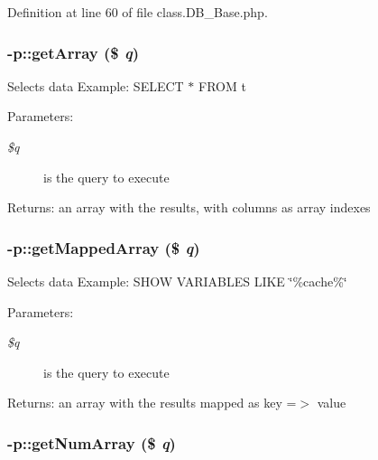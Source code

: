 Definition at line 60 of file class.DB\_\-Base.php.
\subsubsection{-p::getArray (\$ {\em q})\hspace{0.3cm}{\tt  [abstract]}}\label{protocolDB__Base-p_f17c44d57b6e3292c2e5771b51a026f1}


Selects data Example: SELECT $\ast$ FROM t \begin{Desc}
\item[Parameters:]
\begin{description}
\item[{\em \$q}]is the query to execute \end{description}
\end{Desc}
\begin{Desc}
\item[Returns:]an array with the results, with columns as array indexes \end{Desc}
\subsubsection{-p::getMappedArray (\$ {\em q})\hspace{0.3cm}{\tt  [abstract]}}\label{protocolDB__Base-p_4542b6047cb056c25c1c39e09948f1a3}


Selects data Example: SHOW VARIABLES LIKE \char`\"{}\%cache\%\char`\"{} \begin{Desc}
\item[Parameters:]
\begin{description}
\item[{\em \$q}]is the query to execute \end{description}
\end{Desc}
\begin{Desc}
\item[Returns:]an array with the results mapped as key =$>$ value \end{Desc}
\subsubsection{-p::getNumArray (\$ {\em q})\hspace{0.3cm}{\tt  [abstract]}}\label{protocolDB__Base-p_0673f5a50e850ffd91963b3d0435e75a}


